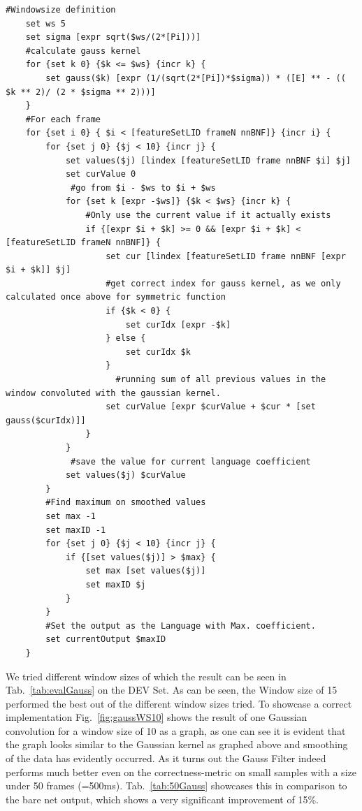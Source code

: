 \begin{lstlisting}[label=lst:tclGauss,caption=Gaussian Smoothing Filter as implemented in tcl/tk for the jrtk]
    #Windowsize definition
    set ws 5
    set sigma [expr sqrt($ws/(2*[Pi]))]
    #calculate gauss kernel
    for {set k 0} {$k <= $ws} {incr k} {
        set gauss($k) [expr (1/(sqrt(2*[Pi])*$sigma)) * ([E] ** - (( $k ** 2)/ (2 * $sigma ** 2)))]
    }
    #For each frame
    for {set i 0} { $i < [featureSetLID frameN nnBNF]} {incr i} {
        for {set j 0} {$j < 10} {incr j} {
            set values($j) [lindex [featureSetLID frame nnBNF $i] $j]
            set curValue 0
	         #go from $i - $ws to $i + $ws
            for {set k [expr -$ws]} {$k < $ws} {incr k} {
                #Only use the current value if it actually exists
                if {[expr $i + $k] >= 0 && [expr $i + $k] < [featureSetLID frameN nnBNF]} {
                    set cur [lindex [featureSetLID frame nnBNF [expr $i + $k]] $j]
                    #get correct index for gauss kernel, as we only calculated once above for symmetric function
                    if {$k < 0} {
                        set curIdx [expr -$k]
                    } else {
                        set curIdx $k
                    }
		              #running sum of all previous values in the window convoluted with the gaussian kernel.
                    set curValue [expr $curValue + $cur * [set gauss($curIdx)]]
                }
            }
	         #save the value for current language coefficient
            set values($j) $curValue
        }
        #Find maximum on smoothed values
        set max -1
        set maxID -1
        for {set j 0} {$j < 10} {incr j} {
            if {[set values($j)] > $max} {
                set max [set values($j)]
                set maxID $j
            }
        }
        #Set the output as the Language with Max. coefficient.
        set currentOutput $maxID
    }
\end{lstlisting}


We tried different window sizes of which the result can be seen in Tab.~\ref{tab:evalGauss} on the DEV Set.  As can be seen, the Window size of 15 performed the best out of the different window sizes tried. To showcase a correct implementation Fig.~\ref{fig:gaussWS10} shows the result of one Gaussian convolution for a window size of 10 as a graph, as one can see it is evident that the graph looks similar to the Gaussian kernel as graphed above and smoothing of the data has evidently occurred.  As it turns out the Gauss Filter indeed performs much better even on the correctness-metric on small samples with a size under 50 frames (=500ms). Tab.~\ref{tab:50Gauss} showcases this in comparison to the bare net output, which shows a very significant improvement of 15\%.


